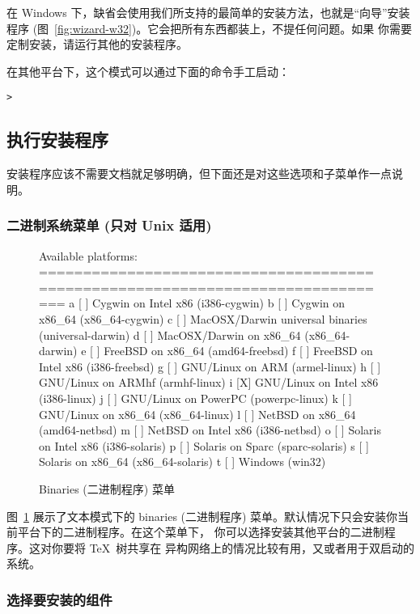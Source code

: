 \documentclass{article}
\begin{document}
在 Windows 下，缺省会使用我们所支持的最简单的安装方法，也就是“向导”安装
程序 (图~\ref{fig:wizard-w32})。它会把所有东西都装上，不提任何问题。如果
你需要定制安装，请运行其他的安装程序。

在其他平台下，这个模式可以通过下面的命令手工启动：
\begin{alltt}
> 
\end{alltt}


\subsection{执行安装程序}
\label{sec:runinstall}

安装程序应该不需要文档就足够明确，但下面还是对这些选项和子菜单作一点说明。

\subsubsection{二进制系统菜单 (只对 Unix 适用)}
\label{sec:binary}

\begin{figure}[tb]
\begin{boxedverbatim}
Available platforms:
===============================================================================
   a [ ] Cygwin on Intel x86 (i386-cygwin)
   b [ ] Cygwin on x86_64 (x86_64-cygwin)
   c [ ] MacOSX/Darwin universal binaries (universal-darwin)
   d [ ] MacOSX/Darwin on x86_64 (x86_64-darwin)
   e [ ] FreeBSD on x86_64 (amd64-freebsd)
   f [ ] FreeBSD on Intel x86 (i386-freebsd)
   g [ ] GNU/Linux on ARM (armel-linux)
   h [ ] GNU/Linux on ARMhf (armhf-linux)
   i [X] GNU/Linux on Intel x86 (i386-linux)
   j [ ] GNU/Linux on PowerPC (powerpc-linux)
   k [ ] GNU/Linux on x86_64 (x86_64-linux)
   l [ ] NetBSD on x86_64 (amd64-netbsd)
   m [ ] NetBSD on Intel x86 (i386-netbsd)
   o [ ] Solaris on Intel x86 (i386-solaris)
   p [ ] Solaris on Sparc (sparc-solaris)
   s [ ] Solaris on x86_64 (x86_64-solaris)
   t [ ] Windows (win32)
\end{boxedverbatim}
\caption{Binaries (二进制程序) 菜单}\label{fig:bin-text}
\end{figure}

图~\ref{fig:bin-text} 展示了文本模式下的 binaries (二进制程序)
菜单。默认情况下只会安装你当前平台下的二进制程序。在这个菜单下，
你可以选择安装其他平台的二进制程序。这对你要将 \TeX\ 树共享在
异构网络上的情况比较有用，又或者用于双启动的系统。

\subsubsection{选择要安装的组件}
\label{sec:components}
\end{document}
